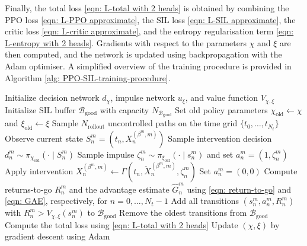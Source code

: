 Finally, the total loss \eqref{eqn: L-total with 2 heads} is obtained by combining the PPO loss \eqref{eqn: L-PPO approximate}, the SIL loss \eqref{eqn: L-SIL approximate}, the critic loss \eqref{eqn: L-critic approximate}, and the entropy regularisation term \eqref{eqn: L-entropy with 2 heads}. Gradients with respect to the parameters $\chi$ and $\xi$ are then computed, and the network is updated using backpropagation with the Adam optimiser. A simplified overview of the training procedure is provided in Algorithm \ref{alg: PPO-SIL-training-procedure}.
\begin{algorithm}[!htbp]
\caption{PPO-SIL Training procedure}
\label{alg: PPO-SIL-training-procedure}
\begin{algorithmic}[1]
\STATE Initialize decision network $d_\chi$, impulse network $u_\xi$, and value function $V_{\chi,\xi}$
\STATE Initialize SIL buffer $\mathcal B_{\mathrm{good}}$ with capacity $N_{\mathcal B_{\mathrm{good}}}$
    \STATE Set old policy parameters $\chi_{\mathrm{old}} \gets \chi$ and $\xi_{\mathrm{old}} \gets \xi$
    \STATE Sample $N_{\mathrm{rollout}}$ uncontrolled paths on the time grid $\{t_0,\ldots,t_{N_t}\}$
            \STATE Observe current state $S_n^m=(t_n,X_n^{(\beta^m, m)})$
            \STATE Sample intervention decision $d_n^m \sim \pi_{\chi_{\mathrm{old}}}(\cdot \mid S_n^m)$
                \STATE Sample impulse $\zeta_n^m \sim \pi_{\xi_{\mathrm{old}}}(\cdot \mid s_n^m)$ and set $a_n^m=(1,\zeta_n^m)$
                \STATE Apply intervention $X_n^{(\beta^m,m)} \gets \Gamma(t_n,\check X_n^{(\beta^m,m)},\zeta_n^m)$
            \ELSE
                \STATE Set $a_n^m=(0,0)$
            \ENDIF
        \ENDFOR
        \STATE Compute returns-to-go $R_n^m$ and the advantage estimate $\hat G_n^m$ using \eqref{eqn: return-to-go} and \eqref{eqn: GAE}, respectively, for $n=0,\ldots,N_t-1$
    \ENDFOR
    \STATE Add all transitions $(s_n^m,a_n^m,R_n^m)$ with
    $R_n^m > V_{\chi,\xi}(s_n^m)$ to $\mathcal B_{\mathrm{good}}$
        \STATE Remove the oldest transitions from $\mathcal B_{\mathrm{good}}$
    \ENDIF
    \STATE Compute the total loss using \eqref{eqn: L-total with 2 heads}
    \STATE Update $(\chi,\xi)$ by gradient descent using Adam
\ENDFOR
\end{algorithmic}
\end{algorithm}